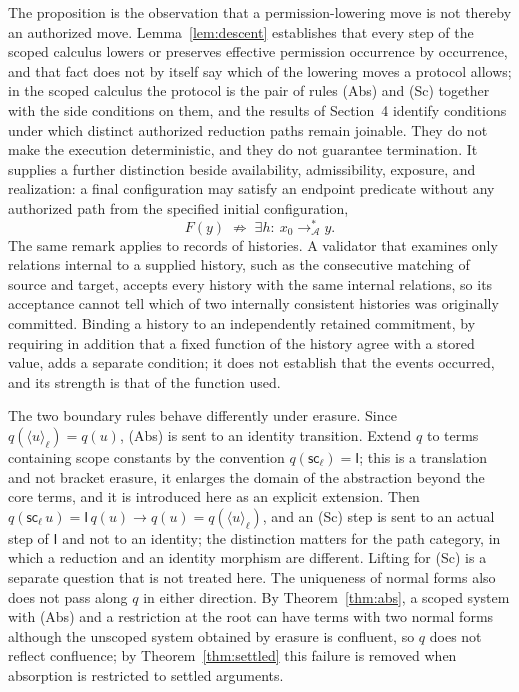 \documentclass[11pt]{article}
\theoremstyle{definition}
\theoremstyle{remark}
\newcommand{\cI}{\mathsf{I}}
\newcommand{\br}[2]{\langle #1\rangle_{#2}}
\newcommand{\sca}[1]{\mathsf{sc}_{#1}}
\begin{document}
The proposition is the observation that a permission-lowering move is not thereby an authorized move. Lemma~\ref{lem:descent} establishes that every step of the scoped calculus lowers or preserves effective permission occurrence by occurrence, and that fact does not by itself say which of the lowering moves a protocol allows; in the scoped calculus the protocol is the pair of rules (Abs) and (Sc) together with the side conditions on them, and the results of Section~4 identify conditions under which distinct authorized reduction paths remain joinable. They do not make the execution deterministic, and they do not guarantee termination. It supplies a further distinction beside availability, admissibility, exposure, and realization: a final configuration may satisfy an endpoint predicate without any authorized path from the specified initial configuration,
\[
F(y)\;\not\Rightarrow\;\exists h:\ x_0\to_{\mathcal A}^{*}y.
\]
The same remark applies to records of histories. A validator that examines only relations internal to a supplied history, such as the consecutive matching of source and target, accepts every history with the same internal relations, so its acceptance cannot tell which of two internally consistent histories was originally committed. Binding a history to an independently retained commitment, by requiring in addition that a fixed function of the history agree with a stored value, adds a separate condition; it does not establish that the events occurred, and its strength is that of the function used.

The two boundary rules behave differently under erasure. Since $q(\br u\ell)=q(u)$, (Abs) is sent to an identity transition. Extend $q$ to terms containing scope constants by the convention $q(\sca\ell)=\cI$; this is a translation and not bracket erasure, it enlarges the domain of the abstraction beyond the core terms, and it is introduced here as an explicit extension. Then $q(\sca\ell\,u)=\cI\,q(u)\to q(u)=q(\br u\ell)$, and an (Sc) step is sent to an actual step of $\cI$ and not to an identity; the distinction matters for the path category, in which a reduction and an identity morphism are different. Lifting for (Sc) is a separate question that is not treated here. The uniqueness of normal forms also does not pass along $q$ in either direction. By Theorem~\ref{thm:abs}, a scoped system with (Abs) and a restriction at the root can have terms with two normal forms although the unscoped system obtained by erasure is confluent, so $q$ does not reflect confluence; by Theorem~\ref{thm:settled} this failure is removed when absorption is restricted to settled arguments.
\end{document}
